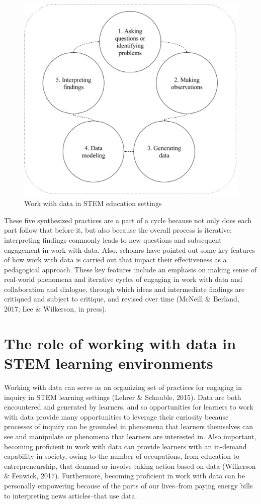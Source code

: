 \documentclass[]{book}
\theoremstyle{definition}
\theoremstyle{definition}
\theoremstyle{definition}
\theoremstyle{remark}
\begin{document}
\begin{figure}

{\centering \includegraphics[width=0.8\linewidth]{images/figure1} 

}

\caption{Work with data in STEM education settings}\label{fig:unnamed-chunk-1}
\end{figure}

These five synthesized practices are a part of a cycle because not only
does each part follow that before it, but also because the overall
process is iterative: interpreting findings commonly leads to new
questions and subsequent engagement in work with data. Also, scholars
have pointed out some key features of how work with data is carried out
that impact their effectiveness as a pedagogical approach. These key
features include an emphasis on making sense of real-world phenomena and
iterative cycles of engaging in work with data and collaboration and
dialogue, through which ideas and intermediate findings are critiqued
and subject to critique, and revised over time (McNeill \& Berland,
2017; Lee \& Wilkerson, in press).

\section{The role of working with data in STEM learning
environments}\label{the-role-of-working-with-data-in-stem-learning-environments}

Working with data can serve as an organizing set of practices for
engaging in inquiry in STEM learning settings (Lehrer \& Schauble,
2015). Data are both encountered and generated by learners, and so
opportunities for learners to work with data provide many opportunities
to leverage their curiosity because processes of inquiry can be grounded
in phenomena that learners themselves can see and manipulate or
phenomena that learners are interested in. Also important, becoming
proficient in work with data can provide learners with an in-demand
capability in society, owing to the number of occupations, from
education to entrepreneurship, that demand or involve taking action
based on data (Wilkerson \& Fenwick, 2017). Furthermore, becoming
proficient in work with data can be personally empowering because of the
parts of our lives--from paying energy bills to interpreting news
articles--that use data.
\end{document}
